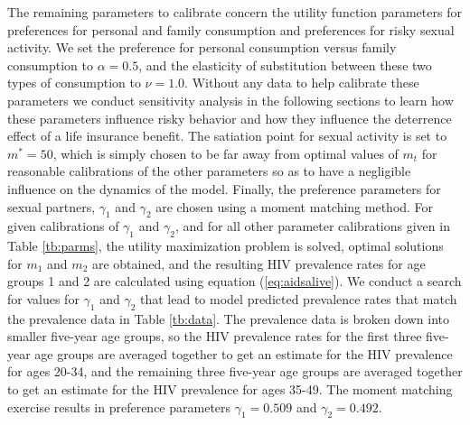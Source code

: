 \documentclass[12pt]{article}
\begin{document}
The remaining parameters to calibrate concern the utility function parameters for preferences for personal and family consumption and preferences for risky sexual activity.  We set the preference for personal consumption versus family consumption to $\alpha=0.5$, and the elasticity of substitution between these two types of consumption to $\nu=1.0$.  Without any data to help calibrate these parameters we conduct sensitivity analysis in the following sections to learn how these parameters influence risky behavior and how they influence the deterrence effect of a life insurance benefit.  The satiation point for sexual activity is set to $m^*=50$, which is simply chosen to be far away from optimal values of $m_t$ for reasonable calibrations of the other parameters so as to have a negligible influence on the dynamics of the model.  Finally, the preference parameters for sexual partners, $\gamma_1$ and $\gamma_2$ are chosen using a moment matching method.  For given calibrations of $\gamma_1$ and $\gamma_2$, and for all other parameter calibrations given in Table \ref{tb:parms}, the utility maximization problem is solved, optimal solutions for $m_1$ and $m_2$ are obtained, and the resulting HIV prevalence rates for age groups 1 and 2 are calculated using equation (\ref{eq:aidsalive}).  We conduct a search for values for $\gamma_1$ and $\gamma_2$ that lead to model predicted prevalence rates that match the prevalence data in Table \ref{tb:data}.  The prevalence data is broken down into smaller five-year age groups, so the HIV prevalence rates for the first three five-year age groups are averaged together to get an estimate for the HIV prevalence for ages 20-34, and the remaining three five-year age groups are averaged together to get an estimate for the HIV prevalence for ages 35-49.  The moment matching exercise results in preference parameters $\gamma_1=0.509$ and $\gamma_2=0.492$.
\end{document}

